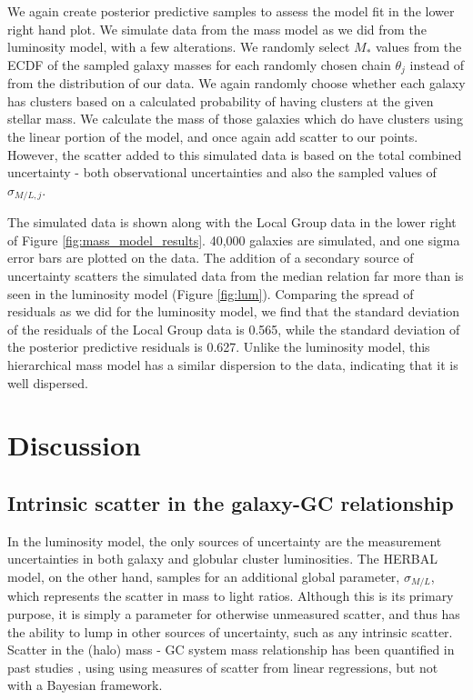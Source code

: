 \documentclass[twocolumn]{aastex631}
\begin{document}
We again create posterior predictive samples to assess the model fit in the lower right hand plot. We simulate data from the mass model as we did from the luminosity model, with a few alterations. We randomly select $M_*$ values from the ECDF of the sampled galaxy masses for each randomly chosen chain $\theta_j$ instead of from the distribution of our data. We again randomly choose whether each galaxy has clusters based on a calculated probability of having clusters at the given stellar mass. We calculate the mass of those galaxies which do have clusters using the linear portion of the model, and once again add scatter to our points. However, the scatter added to this simulated data is based on the total combined uncertainty - both observational uncertainties and also the sampled values of $\sigma_{M/L,j}$.

The simulated data is shown along with the Local Group data in the lower right of Figure \ref{fig:mass_model_results}. 40,000 galaxies are simulated, and one sigma error bars are plotted on the data. The addition of a secondary source of uncertainty scatters the simulated data from the median relation far more than is seen in the luminosity model (Figure \ref{fig:lum}). Comparing the spread of residuals as we did for the luminosity model, we find that the standard deviation of the residuals of the Local Group data is 0.565, while the standard deviation of the posterior predictive residuals is 0.627. Unlike the luminosity model, this hierarchical mass model has a similar dispersion to the data, indicating that it is well dispersed.

\vspace{\baselineskip}
\section{Discussion} \label{sec:disc}

\subsection{Intrinsic scatter in the galaxy-GC relationship}

In the luminosity model, the only sources of uncertainty are the measurement uncertainties in both galaxy and globular cluster luminosities. The HERBAL model, on the other hand, samples for an additional global parameter, $\sigma_{M/L}$, which represents the scatter in mass to light ratios. Although this is its primary purpose, it is simply a parameter for otherwise unmeasured scatter, and thus has the ability to lump in other sources of uncertainty, such as any intrinsic scatter. Scatter in the (halo) mass - GC system mass relationship has been quantified in past studies \citep[e.g.][]{Harris2013, Choksi2019}, using using measures of scatter from linear regressions, but not with a Bayesian framework. 
\end{document}
